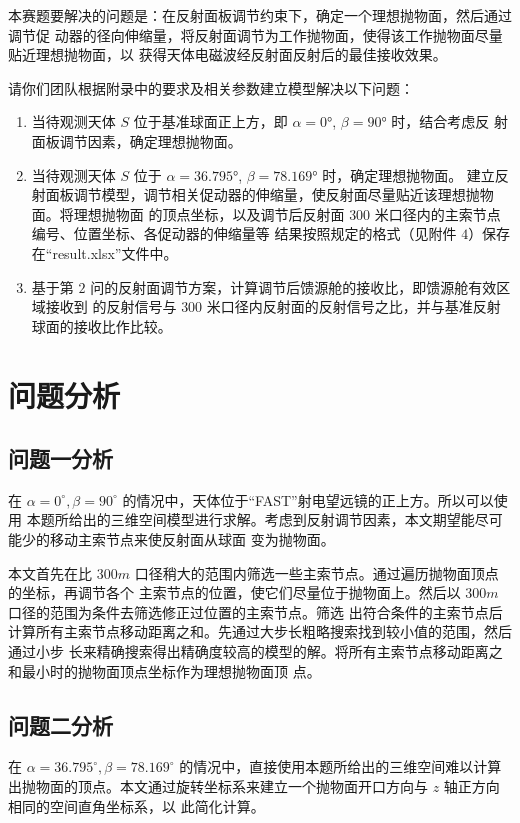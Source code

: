 \documentclass[withoutpreface,bwprint]{cumcmthesis} %
\begin{document}
本赛题要解决的问题是：在反射面板调节约束下，确定一个理想抛物面，然后通过调节促
动器的径向伸缩量，将反射面调节为工作抛物面，使得该工作抛物面尽量贴近理想抛物面，以
获得天体电磁波经反射面反射后的最佳接收效果。

请你们团队根据附录中的要求及相关参数建立模型解决以下问题：
\begin{enumerate}
    \item 当待观测天体 $𝑆$ 位于基准球面正上方，即 $\alpha = 0°$, $\beta = 90°$ 时，结合考虑反
          射面板调节因素，确定理想抛物面。
    \item 当待观测天体 $𝑆$ 位于 $\alpha = 36.795°$, $\beta = 78.169°$ 时，确定理想抛物面。
          建立反射面板调节模型，调节相关促动器的伸缩量，使反射面尽量贴近该理想抛物面。将理想抛物面
          的顶点坐标，以及调节后反射面 $300$ 米口径内的主索节点编号、位置坐标、各促动器的伸缩量等
          结果按照规定的格式（见附件 $4$）保存在“result.xlsx”文件中。
    \item 基于第 $2$ 问的反射面调节方案，计算调节后馈源舱的接收比，即馈源舱有效区域接收到
          的反射信号与 $300$ 米口径内反射面的反射信号之比，并与基准反射球面的接收比作比较。
\end{enumerate}

\section{问题分析}
\subsection{问题一分析}
在 $\alpha = 0^\circ , \beta = 90^\circ$ 的情况中，天体位于“FAST”射电望远镜的正上方。所以可以使用
本题所给出的三维空间模型进行求解。考虑到反射调节因素，本文期望能尽可能少的移动主索节点来使反射面从球面
变为抛物面。

本文首先在比 $300m$ 口径稍大的范围内筛选一些主索节点。通过遍历抛物面顶点的坐标，再调节各个
主索节点的位置，使它们尽量位于抛物面上。然后以 $300m$ 口径的范围为条件去筛选修正过位置的主索节点。筛选
出符合条件的主索节点后计算所有主索节点移动距离之和。先通过大步长粗略搜索找到较小值的范围，然后通过小步
长来精确搜索得出精确度较高的模型的解。将所有主索节点移动距离之和最小时的抛物面顶点坐标作为理想抛物面顶
点。
\subsection{问题二分析}
在 $\alpha = 36.795^\circ , \beta = 78.169^\circ$ 的情况中，直接使用本题所给出的三维空间难以计算
出抛物面的顶点。本文通过旋转坐标系来建立一个抛物面开口方向与 $z$ 轴正方向相同的空间直角坐标系，以
此简化计算。
\end{document}
